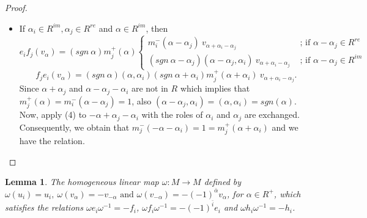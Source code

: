 \documentclass[11pt]{amsart}
\theoremstyle{plain}
\newtheorem{lemma}[thm]{Lemma}
\theoremstyle{definition}
\numberwithin{equation}{section}
\newcommand{\al}{\alpha}
\newcommand{\om}{\omega}
\begin{document}
\begin{proof}
\begin{itemize}
			\item[5.] If $\al_i\in R^{im},\al_j\in R^{re}$ and $\al\in R^{im}$, then 
			 $$e_if_j(v_{\al})=(sgn~\al)m_j^+(\al)\begin{cases}
			 	m_i^-(\al-\al_j)~v_{\al+\al_i-\al_j}&\text{ ; if }\al-\al_j\in R^{re}\\(sgn~\al-\al_j)(\al-\al_j,\al_i)~v_{\al+\al_i-\al_j}&\text{ ; if }\al-\al_j\in R^{im}
			 \end{cases}$$ $$f_je_i(v_{\al})=(sgn~\al)(\al,\al_i)(sgn~\al+\al_i)m_j^+(\al+\al_i)~v_{\al+\al_i-\al_j}.$$
			Since $\al+\al_j$ and $\al-\al_j-\al_i$ are not in $R$ which implies that $m_j^+(\al)=m_i^-(\al-\al_j)=1$, also $(\al-\al_j,\al_i)=(\al,\al_i)=sgn(\al)$. Now, apply (4) to $-\al+\al_j-\al_i$ with the roles of $\al_i$ and $\al_j$ are exchanged. Consequently, we obtain that $m_j^-(-\al-\al_i)=1=m_j^+(\al+\al_i)$ and we have the relation.
		\end{itemize}
		
		
	\end{proof}
	\begin{lemma}\label{lem8}
		The homogeneous linear map $\om:M\rightarrow M$ defined by $\om(u_i)=u_i,~\om(v_{\al})=-v_{-\al}\text{ and }\om(v_{-\al})=-(-1)^{\bar{\al}}v_{\al}$, for $\al\in R^+$, which satisfies the relations $\om e_i\om^{-1}=-f_i$, $\om f_i\om^{-1}=-(-1)^{\bar{i}}e_i$ and $\om h_i\om^{-1}=-h_i$.
	\end{lemma}
\end{document}
